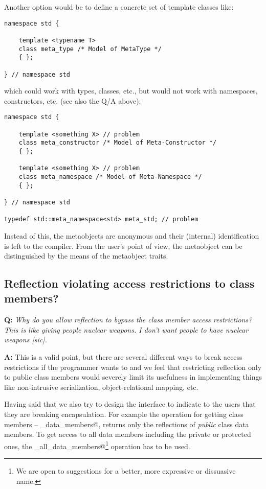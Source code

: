 Another option would be to define a concrete set of template classes like:

\begin{verbatim}
namespace std {

	template <typename T>
	class meta_type /* Model of MetaType */
	{ };

} // namespace std
\end{verbatim}

which could work with types, classes, etc., but would not work with namespaces,
constructors, etc. (see also the Q/A above):

\begin{verbatim}
namespace std {

	template <something X> // problem
	class meta_constructor /* Model of Meta-Constructor */
	{ };

	template <something X> // problem
	class meta_namespace /* Model of Meta-Namespace */
	{ };

} // namespace std

typedef std::meta_namespace<std> meta_std; // problem
\end{verbatim}

Instead of this, the metaobjects are anonymous and their (internal) identification
is left to the compiler. From the user's point of view, the metaobject can be distinguished
by the means of the metaobject traits.

\subsection{Reflection violating access restrictions to class members?}

\textbf{Q:} {\em Why do you allow reflection to bypass the class member access
restrictions? This is like giving people nuclear weapons. I don't want people
to have nuclear weapons [sic].}

\textbf{A:}
This is a valid point, but there are several different ways to break access restrictions
if the programmer wants to and we feel that restricting reflection only to public
class members would severely limit its usefulness in implementing things like
non-intrusive serialization, object-relational mapping, etc.

Having said that we also try to design the interface to indicate to the users
that they are breaking encapsulation. For example the  operation
for getting class members -- \verb@get_data_members@, returns only the
reflections of {\em public} class data members. To get access to all data members
including the private or protected ones, the \verb@get_all_data_members@\footnote
{We are open to suggestions for a better, more expressive or dissuasive name.}
operation has to be used.

